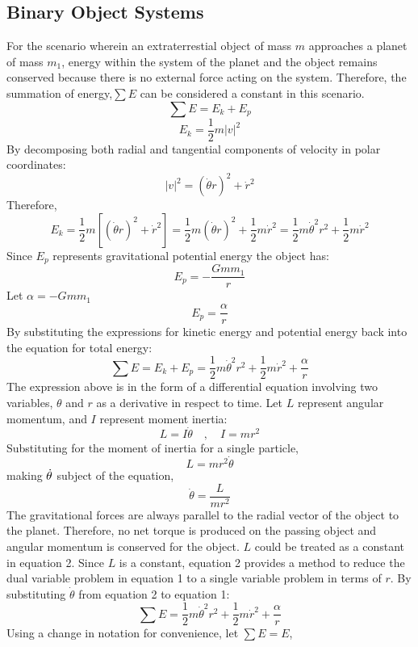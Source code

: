 \documentclass[a4paper, 12pt]{report}
\begin{document}
\begin{center}
\chapter{Binary Object Systems}
\begin{comment}
\end{comment}
\begin{comment}
\end{comment}
For the scenario wherein an extraterrestial object of mass $m$ approaches a planet of mass $m_1$, energy within the system of the planet and the object remains conserved because there is no external force acting on the system. Therefore, the summation of energy,$\sum E$ can be considered a constant in this scenario.
$$\sum E = E_k + E_p$$
$$E_k =\frac{1}{2}  m |v|^2$$
By decomposing both radial and tangential components of velocity in polar coordinates:
$$|v|^2 = (\dot{\theta}r)^2 + \dot{r}^2$$
Therefore, 
$$E_k = \frac{1}{2}m[(\dot{\theta}r)^2 + \dot{r}^2] = \frac{1}{2}m(\dot{\theta}r)^2 + \frac{1}{2}m\dot{r}^2 = \frac{1}{2}m\dot{\theta}^2 r^2 + \frac{1}{2}m\dot{r}^2$$
Since $E_p$ represents gravitational potential energy the object has:
$$E_p = -\frac{Gmm_1}{r}$$
Let $\alpha = -Gmm_1$
$$E_p = \frac{\alpha}{r}$$
By substituting the expressions for kinetic energy and potential energy back into the equation for total energy:
$$\sum E = E_k + E_p = \frac{1}{2}m\dot{\theta}^2 r^2 + \frac{1}{2}m\dot{r}^2 + \frac{\alpha}{r}$$
The expression above is in the form of a differential equation involving two variables, $\theta$ and $r$ as a derivative in respect to time. Let $L$ represent angular momentum, and $I$ represent moment inertia:
$$L = I \dot{\theta} \quad,\quad I = mr^2$$
Substituting for the moment of inertia for a single particle,
$$L =  mr^2\dot{\theta}$$
making $\displaystyle{\dot{\theta}}$ subject of the equation,
$$\dot{\theta} = \frac{L}{mr^2}$$
The gravitational forces are always parallel to the radial vector of the object to the planet. Therefore, no net torque is produced on the passing object and angular momentum is conserved for the object. $L$ could be treated as a constant in equation 2. Since $L$ is a constant, equation 2 provides a method to reduce the dual variable problem in equation 1 to a single variable problem in terms of $r$. By substituting $\dot{\theta}$ from equation 2 to equation 1:
$$\sum E = \frac{1}{2}m\dot{\theta}^2r^2 + \frac{1}{2}m\dot{r}^2 +\frac{\alpha}{r}$$
Using a change in notation for convenience, let $\sum E = E$,

\end{center}
\end{document}
